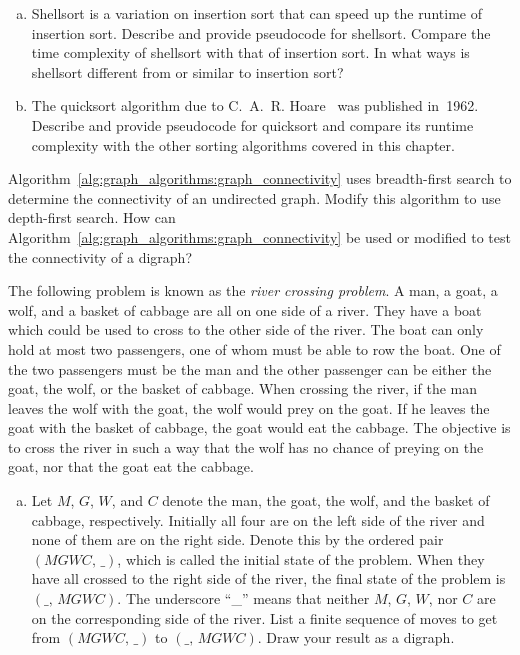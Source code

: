 \begin{problem}
\begin{enumerate}[(a)]
  \item Shellsort is a variation on insertion sort that can speed up
    the runtime of insertion sort. Describe and provide pseudocode for
    shellsort. Compare the time complexity of shellsort with that of
    insertion sort. In what ways is shellsort different from or
    similar to insertion sort?

  \item The quicksort algorithm due to C.~A.~R. Hoare~\cite{Hoare1962}
    was published in~1962. Describe and provide pseudocode for
    quicksort and compare its runtime complexity with the other
    sorting algorithms covered in this chapter.
  \end{enumerate}

\item\label{prob:graph_algorithms:connectivity_with_DFS_BFS}
  Algorithm~\ref{alg:graph_algorithms:graph_connectivity} uses
  breadth-first search to determine the connectivity of an undirected
  graph. Modify this algorithm to use depth-first search. How can
  Algorithm~\ref{alg:graph_algorithms:graph_connectivity} be used or
  modified to test the connectivity of a digraph?

\item The following problem is known as the
  \emph{river crossing problem}. A man,
  a goat, a wolf, and a basket of cabbage are all on one side of a
  river. They have a boat which could be used to cross to the other
  side of the river. The boat can only hold at most two passengers,
  one of whom must be able to row the boat. One of the two passengers
  must be the man and the other passenger can be either the goat, the
  wolf, or the basket of cabbage. When crossing the river, if the man
  leaves the wolf with the goat, the wolf would prey on the goat. If
  he leaves the goat with the basket of cabbage, the goat would eat
  the cabbage. The objective is to cross the river in such a way that
  the wolf has no chance of preying on the goat, nor that the goat eat
  the cabbage.
  \begin{enumerate}[(a)]
  \item Let $M$, $G$, $W$, and $C$ denote the man, the goat, the wolf,
    and the basket of cabbage, respectively. Initially all four are on
    the left side of the river and none of them are on the right
    side. Denote this by the ordered pair $(MGWC,\, \_)$, which is
    called the initial state of the problem. When
    they have all crossed to the right side of the river, the
    final state of the problem is $(\_,\, MGWC)$.
    The underscore ``\_'' means that neither $M$, $G$, $W$, nor $C$
    are on the corresponding side of the river. List a finite sequence
    of moves to get from $(MGWC,\, \_)$ to $(\_,\, MGWC)$. Draw your
    result as a digraph.


\end{enumerate}
\end{problem}
